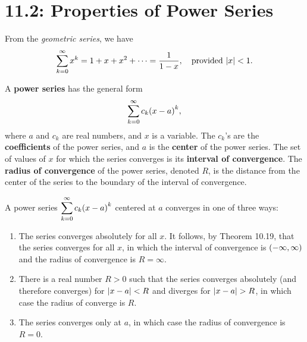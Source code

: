 \documentclass[../mathNotesPreamble]{subfiles}
\begin{document}
  \section{11.2: Properties of Power Series}

  From the \textit{geometric series}, we have
    \[\sum_{k=0}^\infty x^k=1+x+x^2+\dots=\frac{1}{1-x},\quad\textnormal{provided } {\left\vert x\right\vert}<1.\]

  \begin{defn*}
    A \textbf{power series} has the general form
      \[\sum_{k=0}^\infty c_k{\left(x-a\right)}^k,\]
    where $a$ and $c_k$ are real numbers, and $x$ is a variable. The $c_k$'s are the \textbf{coefficients} of the power series, and $a$ is the \textbf{center} of the power series. The set of values of $x$ for which the series converges is its \textbf{interval of convergence}. The \textbf{radius of convergence} of the power series, denoted $R$, is the distance from the center of the series to the boundary of the interval of convergence.
  \end{defn*}

  \begin{thmBox*}
    A power series $\displaystyle\sum_{k=0}^\infty c_k{\left(x-a\right)}^k$ centered at $a$ converges in one of three ways:
    \begin{enumerate}
      \item The series converges absolutely for all $x$. It follows, by Theorem 10.19, that the series converges for all $x$, in which the interval of convergence is ${\left(-\infty,\infty\right)}$ and the radius of convergence is $R=\infty$.
      \item There is a real number $R>0$ such that the series converges absolutely (and therefore converges) for ${\left\vert x-a\right\vert}<R$ and diverges for ${\left\vert x-a\right\vert}>R$, in which case the radius of converge is $R$.
      \item The series converges only at $a$, in which case the radius of convergence is $R=0$.
    \end{enumerate}
  \end{thmBox*}
  \pagebreak
\end{document}
